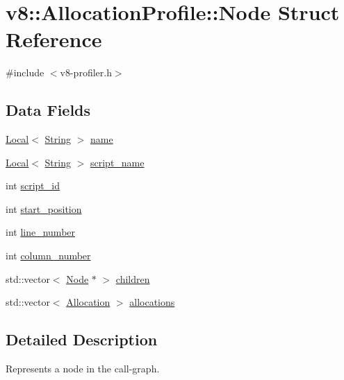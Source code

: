 \hypertarget{structv8_1_1AllocationProfile_1_1Node}{}\section{v8\+:\+:Allocation\+Profile\+:\+:Node Struct Reference}
\label{structv8_1_1AllocationProfile_1_1Node}


{\ttfamily \#include $<$v8-\/profiler.\+h$>$}

\subsection*{Data Fields}
\begin{DoxyCompactItemize}
\item 
\hyperlink{classv8_1_1Local}{Local}$<$ \hyperlink{classv8_1_1String}{String} $>$ \hyperlink{structv8_1_1AllocationProfile_1_1Node_af9f2c323d6a11e836c02e8ac88adc5a8}{name}
\item 
\hyperlink{classv8_1_1Local}{Local}$<$ \hyperlink{classv8_1_1String}{String} $>$ \hyperlink{structv8_1_1AllocationProfile_1_1Node_acd6567ac06a0bae713390559128e9c62}{script\+\_\+name}
\item 
int \hyperlink{structv8_1_1AllocationProfile_1_1Node_a4a746de878d9ad42b32fda4c365b98fb}{script\+\_\+id}
\item 
int \hyperlink{structv8_1_1AllocationProfile_1_1Node_a6caceefbf826a0425adc74331cc7a910}{start\+\_\+position}
\item 
int \hyperlink{structv8_1_1AllocationProfile_1_1Node_ac9773c92a3af3a9a9420337599e68bd9}{line\+\_\+number}
\item 
int \hyperlink{structv8_1_1AllocationProfile_1_1Node_a7cf86acc298428c858673fc1f9dbe305}{column\+\_\+number}
\item 
std\+::vector$<$ \hyperlink{structv8_1_1AllocationProfile_1_1Node}{Node} $\ast$ $>$ \hyperlink{structv8_1_1AllocationProfile_1_1Node_a176673c0440cb1baaf7713e14da84db0}{children}
\item 
std\+::vector$<$ \hyperlink{structv8_1_1AllocationProfile_1_1Allocation}{Allocation} $>$ \hyperlink{structv8_1_1AllocationProfile_1_1Node_a6ee0934b35ba77fb5d8b53f02d5a3068}{allocations}
\end{DoxyCompactItemize}


\subsection{Detailed Description}
Represents a node in the call-\/graph. 

